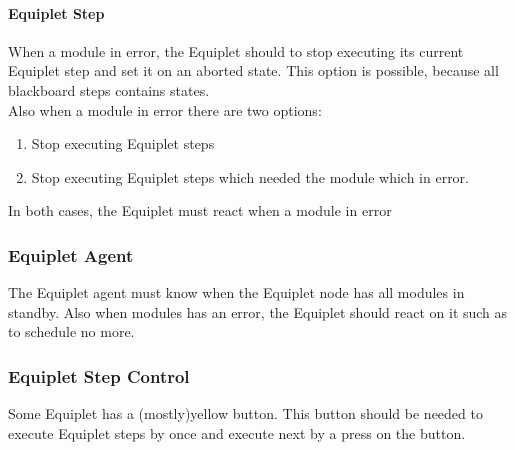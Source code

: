 \paragraph{Equiplet Step}When a module in error, the Equiplet should to stop executing its current Equiplet step and set it on an aborted state. This option is possible, because all blackboard steps contains states. 
\\Also when a module in error there are two options:
\begin{enumerate}
\item Stop executing Equiplet steps
\item Stop executing Equiplet steps which needed the module which in error.
\end{enumerate}
In both cases, the Equiplet must react when a module in error
\subsubsection{Equiplet Agent}
The Equiplet agent must know when the Equiplet node has all modules in standby. Also when modules has an error, the Equiplet should react on it such as to schedule no more.
\subsubsection{Equiplet Step Control}
Some Equiplet has a (mostly)yellow button. This button should be needed to execute Equiplet steps by once and execute next by a press on the button.